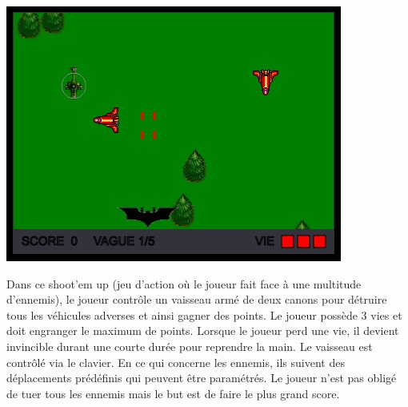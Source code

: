 \begin{minipage}{6cm}
\includegraphics[width=\linewidth]{img/capturejeu_1942}
\end{minipage}
\hfill
\begin{minipage}{9cm}
Dans ce shoot'em up (jeu d’action où le joueur fait face à une multitude d’ennemis), 
le joueur contrôle un vaisseau armé de deux canons pour détruire tous les véhicules adverses et ainsi gagner des points. 
Le joueur possède 3 vies et doit engranger le maximum de points. Lorsque le joueur perd une vie, il devient invincible durant une courte durée 
pour reprendre la main. Le vaisseau est contrôlé via le clavier. En ce qui concerne les ennemis, 
ils suivent des déplacements prédéfinis qui peuvent être paramétrés. 
Le joueur n’est pas obligé de tuer tous les ennemis mais le but est de faire le plus grand score.
\end{minipage}

